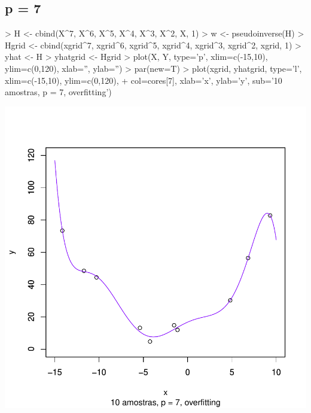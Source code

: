 \documentclass{article}
\begin{document}
\subsection{p = 7}
\begin{Schunk}
\begin{Sinput}
> H <- cbind(X^7, X^6, X^5, X^4, X^3, X^2, X, 1)
> w <- pseudoinverse(H) %
> Hgrid <- cbind(xgrid^7, xgrid^6, xgrid^5, xgrid^4, xgrid^3, xgrid^2, xgrid, 1)
> yhat <- H %
> yhatgrid <- Hgrid %
> plot(X, Y, type='p', xlim=c(-15,10), ylim=c(0,120), xlab='', ylab='')
> par(new=T)
> plot(xgrid, yhatgrid, type='l', xlim=c(-15,10), ylim=c(0,120),
+      col=cores[7], xlab='x', ylab='y', sub='10 amostras, p = 7, overfitting')
\end{Sinput}
\end{Schunk}
\includegraphics{aprox-008}
\end{document}
